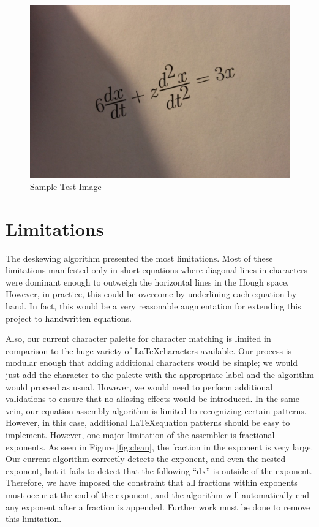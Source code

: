 \documentclass[journal]{IEEEtran}
\begin{document}
\begin{figure}[!t]
    \centering
    \includegraphics[width=\columnwidth]{test_img}
    \caption{Sample Test Image}
    \label{fig:test_img}
\end{figure}

\section{Limitations}
The deskewing algorithm presented the most limitations. Most of these limitations manifested only in short equations where diagonal lines in characters were dominant enough to outweigh the horizontal lines in the Hough space. However, in practice, this could be overcome by underlining each equation by hand. In fact, this would be a very reasonable augmentation for extending this project to handwritten equations.  

Also, our current character palette for character matching is limited in comparison to the huge variety of \LaTeX characters available. Our process is modular enough that adding additional characters would be simple; we would just add the character to the palette with the appropriate label and the algorithm would proceed as usual. However, we would need to perform additional validations to ensure that no aliasing effects would be introduced. In the same vein, our equation assembly algorithm is limited to recognizing certain patterns. However, in this case, additional \LaTeX equation patterns should be easy to implement.
However, one major limitation of the assembler is fractional exponents. As seen in Figure \ref{fig:clean}, the fraction in the exponent is very large. Our current algorithm correctly detects the exponent, and even the nested exponent, but it fails to detect that the following “dx” is outside of the exponent. Therefore, we have imposed the constraint that all fractions within exponents must occur at the end of the exponent, and the algorithm will automatically end any exponent after a fraction is appended. Further work must be done to remove this limitation.
\end{document}

